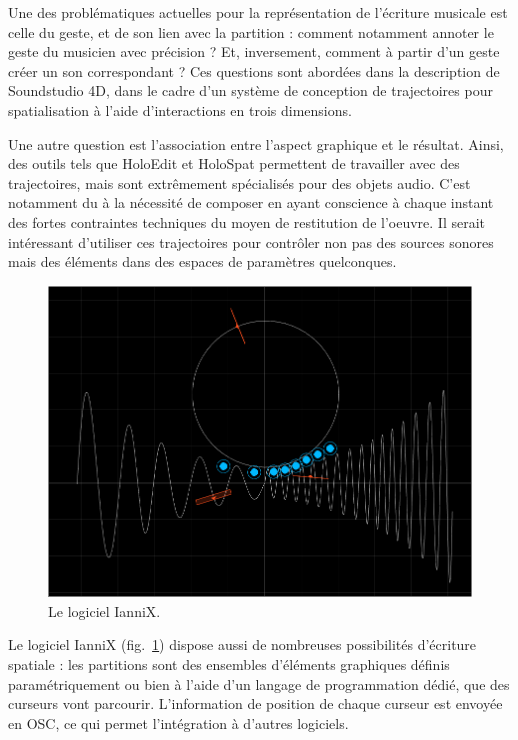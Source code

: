 \documentclass[french,12pt]{article}
\begin{document}
Une des problématiques actuelles pour la représentation de l'écriture musicale est celle du geste, et de son lien avec la partition : comment notamment annoter le geste du musicien avec précision ? Et, inversement, comment à partir d'un geste créer un son correspondant ? Ces questions sont abordées dans la description de Soundstudio 4D\cite{sheridan_soundstudio_2004}, dans le cadre d'un système de conception de trajectoires pour spatialisation à l'aide d'interactions en trois dimensions.

Une autre question est l'association entre l'aspect graphique et le résultat. Ainsi, des outils tels que HoloEdit et HoloSpat permettent de travailler avec des trajectoires, mais sont extrêmement spécialisés pour des objets audio. C'est notamment du à la nécessité de composer en ayant conscience à chaque instant des fortes contraintes techniques du moyen de restitution de l'oeuvre. Il serait intéressant d'utiliser ces trajectoires pour contrôler non pas des sources sonores mais des éléments dans des espaces de paramètres quelconques.

\begin{figure}[h]
    \centering
    \includegraphics[scale=0.3]{images/iannix.png}
    \caption{Le logiciel IanniX.}
    \label{fig.iannix}
\end{figure}

Le logiciel IanniX\cite{jacquemin_iannix_2012} (fig.~\ref{fig.iannix}) dispose aussi de nombreuses possibilités d'écriture spatiale : les partitions sont des ensembles d'éléments graphiques définis paramétriquement ou bien à l'aide d'un langage de programmation dédié, que des curseurs vont parcourir. L'information de position de chaque curseur est envoyée en OSC, ce qui permet l'intégration à d'autres logiciels.
\end{document}
